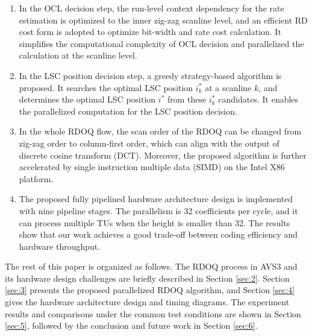 \documentclass[lettersize,journal]{IEEEtran}
\begin{document}
\begin{enumerate}[]
	\item In the OCL decision step, the run-level context dependency for the rate estimation is optimized to the inner zig-zag scanline level, and an efficient RD cost form is adopted to optimize bit-width and rate cost calculation. It simplifies the computational complexity of OCL decision and parallelized the calculation at the scanline level. 
	 \item In the LSC position decision step, a greedy strategy-based algorithm is proposed. It searches the optimal LSC position $i_{k}^{*}$ at a scanline $k$, and determines the optimal LSC position $i^{*}$ from these $i_{k}^{*}$ candidates. It enables the parallelized computation for the LSC position decision. 
	 \item In the whole RDOQ flow, the scan order of the RDOQ can be changed from zig-zag order to column-first order, which can align with the output of discrete cosine transform (DCT). Moreover, the proposed algorithm is further accelerated by single instruction multiple data (SIMD) on the Intel X86 platform. 
	\item The proposed fully pipelined hardware architecture design is implemented with nine pipeline stages. The parallelism is 32 coefficients per cycle, and it can process multiple TUs when the height is smaller than 32. The results show that our work achieves a good trade-off between coding efficiency and hardware throughput. 
\end{enumerate}
\par
The rest of this paper is organized as follows. The RDOQ process in AVS3 and its hardware design challenges are briefly described in Section \ref{sec:2}. Section \ref{sec:3} presents the proposed parallelized RDOQ algorithm, and Section \ref{sec:4} gives the hardware architecture design and timing diagrams. The experiment results and comparisons under the common test conditions are shown in Section \ref{sec:5}, followed by the conclusion and future work in Section \ref{sec:6}. 
\end{document}
